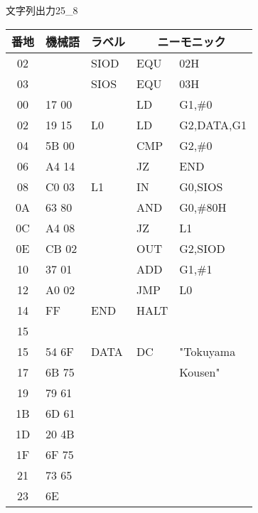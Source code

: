 \begin{reidai}{文字列出力2}{5_8}
\begin{description}
    {\ttfamily\footnotesize\begin{center}
      \begin{tabular}{|c|l|l|l l|} \hline
        番地 & 機械語 & ラベル & \multicolumn{2}{|c|}{ニーモニック} \\
        \hline
        02 &         &  SIOD  &  EQU    & 02H            \\
        03 &         &  SIOS  &  EQU    & 03H            \\
        00 &  17 00  &        &  LD     & G1,\#0         \\
        02 &  19 15  &  L0    &  LD     & G2,DATA,G1     \\
        04 &  5B 00  &        &  CMP    & G2,\#0         \\
        06 &  A4 14  &        &  JZ     & END            \\
        08 &  C0 03  &  L1    &  IN     & G0,SIOS        \\
        0A &  63 80  &        &  AND    & G0,\#80H       \\
        0C &  A4 08  &        &  JZ     & L1             \\
        0E &  CB 02  &        &  OUT    & G2,SIOD        \\
        10 &  37 01  &        &  ADD    & G1,\#1         \\
        12 &  A0 02  &        &  JMP    & L0             \\
        14 &  FF     &  END   &  HALT   &                \\
        15 &         &        &         &                \\
        15 &  54 6F  &  DATA  &  DC     & "Tokuyama      \\
        17 &  6B 75  &        &         &   Kousen"      \\
        19 &  79 61  &        &         &                \\
        1B &  6D 61  &        &         &                \\
        1D &  20 4B  &        &         &                \\
        1F &  6F 75  &        &         &                \\
        21 &  73 65  &        &         &                \\
        23 &  6E     &        &         &                \\

\end{tabular}
\end{center}}
\end{description}
\end{reidai}
